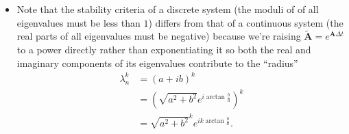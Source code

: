 \documentclass{article}
\renewcommand{\vec}[1]{\boldsymbol{\mathbf{#1}}}
\begin{document}
\begin{itemize}
  \item Note that the stability criteria of a discrete system (the moduli of of all eigenvalues must be less than $1$) differs from that of a continuous system (the real parts of all eigenvalues must be negative) because we're raising $\tilde{\vec{A}} = e^{\vec{A} \Delta t}$ to a power directly rather than exponentiating it so both the real and imaginary components of its eigenvalues contribute to the ``radius'' \begin{align*}
          \lambda_n^k & = (a + i b)^k                                     \\
                      & = (\sqrt{a^2 + b^2} e^{i \arctan \frac{b}{a}})^k  \\
                      & = \sqrt{a^2 + b^2}^k e^{i k \arctan \frac{b}{a}}.
        \end{align*}
\end{itemize}
\end{document}
